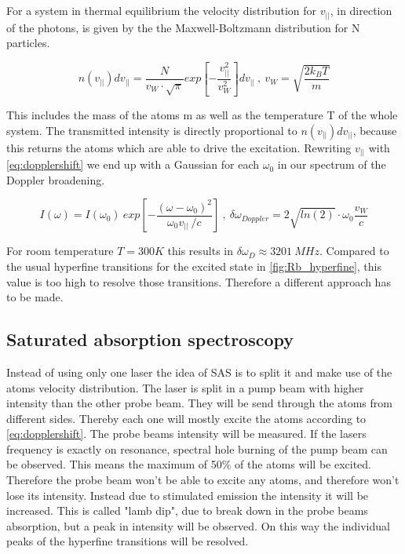\documentclass[]{article}
\begin{document}
For a system in thermal equilibrium the velocity distribution for $v_{||}$, in direction of the photons, is given by the the Maxwell-Boltzmann distribution for N particles. 

\begin{equation}
n(v_{||})dv_{||} = \frac{N}{v_W \cdot \sqrt{\pi}} exp\left[ - \frac{v_{||}^2}{v_W^2} \right] dv_{||} \:,\: v_W= \sqrt{\frac{2k_BT}{m}}
\end{equation}

This includes the mass of the atoms m as well as the temperature T of the whole system. The transmitted intensity is directly proportional to $n(v_{||}) dv_{||}$, because this returns the atoms which are able to drive the excitation. Rewriting $v_{||}$ with \autoref{eq:dopplershift} we end up with a Gaussian for each $\omega_0$ in our spectrum of the Doppler broadening.

\begin{equation}
I(\omega)=I(\omega_0)\ exp\left[ - \frac{(\omega-\omega_0)^2}{\omega_0v_{||}\ / c}\right] \:,\: \delta\omega_{Doppler} = 2 \sqrt{ln(2)} \cdot \omega_0\frac{v_W}{c}
\label{eq:gauss}
\end{equation}

For room temperature $T=300K$ this results in $\delta\omega_{D} \approx 3201\ MHz$. Compared to the usual hyperfine transitions for the excited state in \autoref{fig:Rb_hyperfine}, this value is too high to resolve those transitions. Therefore a different approach has to be made.

\subsection{Saturated absorption spectroscopy}
Instead of using only one laser the idea of SAS is to split it and make use of the atoms velocity distribution. The laser is split in a pump beam with higher intensity than the other probe beam. They will be send through the atoms from different sides. Thereby each one will mostly excite the atoms according to \autoref{eq:dopplershift}. The probe beams intensity will be measured. If the lasers frequency is exactly on resonance, spectral hole burning of the pump beam can be observed. This means the maximum of 50\% of the atoms will be excited. Therefore the probe beam won't be able to excite any atoms, and therefore won't lose its intensity. Instead due to stimulated emission the intensity it will be increased. This is called "lamb dip", due to break down in the probe beams absorption, but a peak in intensity will be observed. On this way the individual peaks of the hyperfine transitions will be resolved.
\end{document}
